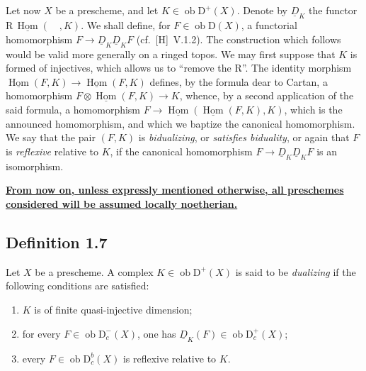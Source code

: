 \documentclass[11pt]{article}
\DeclareMathOperator{\Hom}{Hom}
\newcommand{\R}{\mathrm{R}}
\newcommand{\D}{\mathrm{D}}
\newcommand{\ob}{\operatorname{ob}}
\begin{document}
Let now $X$ be a prescheme, and let $K \in \ob \D^{+}(X)$. Denote by $\underline{D}_K$ the functor $\R\,\underline{\Hom}(\quad, K)$. We shall define, for $F \in \ob \D(X)$, a functorial homomorphism $F \to \underline{D}_K \underline{D}_K F$ (cf.~[H]~V.1.2). The construction which follows would be valid more generally on a ringed topos. We may first suppose that $K$ is formed of injectives, which allows us to ``remove the $\R$''. The identity morphism $\underline{\Hom}(F,K) \to \underline{\Hom}(F,K)$ defines, by the formula dear to Cartan, a homomorphism $F \otimes \underline{\Hom}(F,K) \to K$, whence, by a second application of the said formula, a homomorphism $F \to \underline{\Hom}(\underline{\Hom}(F,K), K)$, which is the announced homomorphism, and which we baptize the canonical homomorphism. We say that the pair $(F,K)$ is \emph{bidualizing}, or \emph{satisfies biduality}, or again that $F$ is \emph{reflexive} relative to $K$, if the canonical homomorphism $F \to \underline{D}_K \underline{D}_K F$ is an isomorphism.

\textbf{\underline{From now on, unless expressly mentioned otherwise, all preschemes considered will be assumed locally noetherian.}}

\subsection*{Definition 1.7}
Let $X$ be a prescheme. A complex $K \in \ob \D^{+}(X)$ is said to be \emph{dualizing} if the following conditions are satisfied:
\begin{enumerate}[label=(\roman*)]
\item $K$ is of finite quasi-injective dimension;
\item for every $F \in \ob \D_c^{-}(X)$, one has $\underline{D}_K(F) \in \ob \D_c^{+}(X)$;
\item every $F \in \ob \D_c^{b}(X)$ is reflexive relative to $K$.
\end{enumerate}
\end{document}
